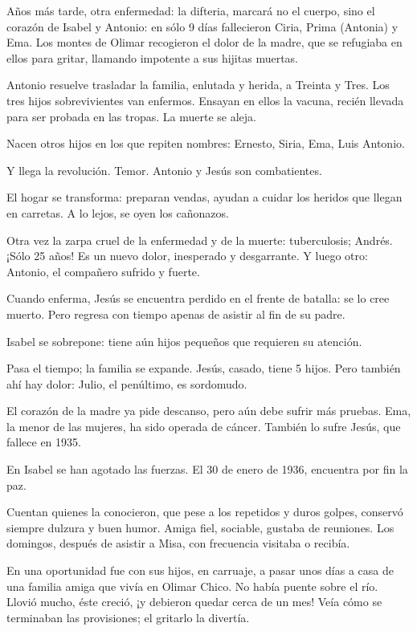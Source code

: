 \documentclass[a4paper]{article}
\begin{document}
Años más tarde, otra enfermedad: la difteria, marcará no el cuerpo, sino el corazón de Isabel y Antonio: en sólo 9 días fallecieron Ciria, Prima (Antonia) y Ema. Los montes de Olimar recogieron el dolor de la madre, que se refugiaba en ellos para gritar, llamando impotente a sus hijitas muertas.

Antonio resuelve trasladar la familia, enlutada y herida, a Treinta y Tres. Los tres hijos sobrevivientes van enfermos. Ensayan en ellos la vacuna, recién llevada para ser probada en las tropas. La muerte se aleja.

Nacen otros hijos en los que repiten nombres: Ernesto, Siria, Ema, Luis Antonio.

Y llega la revolución. Temor. Antonio y Jesús son combatientes.

El hogar se transforma: preparan vendas, ayudan a cuidar los heridos que llegan en carretas. A lo lejos, se oyen los cañonazos.

Otra vez la zarpa cruel de la enfermedad y de la muerte: tuberculosis; Andrés. ¡Sólo 25 años! Es un nuevo dolor, inesperado y desgarrante. Y luego otro: Antonio, el compañero sufrido y fuerte.

Cuando enferma, Jesús se encuentra perdido en el frente de batalla: se lo cree muerto. Pero regresa con tiempo apenas de asistir al fin de su padre.

Isabel se sobrepone: tiene aún hijos pequeños que requieren su atención.

Pasa el tiempo; la familia se expande. Jesús, casado, tiene 5 hijos. Pero también ahí hay dolor: Julio, el penúltimo, es sordomudo.

El corazón de la madre ya pide descanso, pero aún debe sufrir más pruebas. Ema, la menor de las mujeres, ha sido operada de cáncer. También lo sufre Jesús, que fallece en 1935.

En Isabel se han agotado las fuerzas. El 30 de enero de 1936, encuentra por fin la paz.

Cuentan quienes la conocieron, que pese a los repetidos y duros golpes, conservó siempre dulzura y buen humor. Amiga fiel, sociable, gustaba de reuniones. Los domingos, después de asistir a Misa, con frecuencia visitaba o recibía.

En una oportunidad fue con sus hijos, en carruaje, a pasar unos días a casa de una familia amiga que vivía en Olimar Chico. No había puente sobre el río. Llovió mucho, éste creció, ¡y debieron quedar cerca de un mes! Veía cómo se terminaban las provisiones; el gritarlo la divertía.
\end{document}
